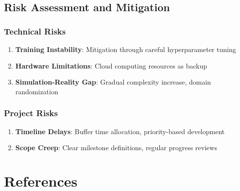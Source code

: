 \documentclass[12pt,a4paper]{article}
\begin{document}
\subsection{Risk Assessment and Mitigation}

\subsubsection{Technical Risks}
\begin{enumerate}
    \item \textbf{Training Instability}: Mitigation through careful hyperparameter tuning
    \item \textbf{Hardware Limitations}: Cloud computing resources as backup
    \item \textbf{Simulation-Reality Gap}: Gradual complexity increase, domain randomization
\end{enumerate}

\subsubsection{Project Risks}
\begin{enumerate}
    \item \textbf{Timeline Delays}: Buffer time allocation, priority-based development
    \item \textbf{Scope Creep}: Clear milestone definitions, regular progress reviews
\end{enumerate}

\section{References}
\end{document}
